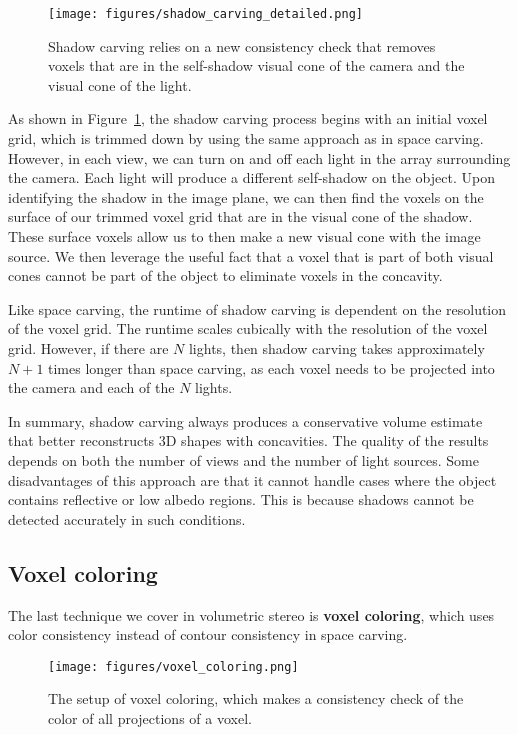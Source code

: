\documentclass[a4paper, 12pt]{article}
\renewcommand\emph{\textbf}
\numberwithin{equation}{section}
\begin{document}
\begin{figure}[h!]
    \centering
    \texttt{[image: figures/shadow\_carving\_detailed.png]}
    \caption{Shadow carving relies on a new consistency check that removes voxels that are in the self-shadow visual cone of the camera and the visual cone of the light.}
    \label{fig:shadow_carving_detailed}
\end{figure}

As shown in Figure~\ref{fig:shadow_carving_detailed}, the shadow carving process begins with an initial voxel grid, which is trimmed down by using the same approach as in space carving. However, in each view, we can turn on and off each light in the array surrounding the camera. Each light will produce a different self-shadow on the object. Upon identifying the shadow in the image plane, we can then find the voxels on the surface of our trimmed voxel grid that are in the visual cone of the shadow. These surface voxels allow us to then make a new visual cone with the image source. We then leverage the useful fact that a voxel that is part of both visual cones cannot be part of the object to eliminate voxels in the concavity. 

Like space carving, the runtime of shadow carving is dependent on the resolution of the voxel grid. The runtime scales cubically with the resolution of the voxel grid. However, if there are $N$ lights, then shadow carving takes approximately $N+1$ times longer than space carving, as each voxel needs to be projected into the camera and each of the $N$ lights.

In summary, shadow carving always produces a conservative volume estimate that better reconstructs 3D shapes with concavities. The quality of the results depends on both the number of views and the number of light sources. Some disadvantages of this approach are that it cannot handle cases where the object contains reflective or low albedo regions. This is because shadows cannot be detected accurately in such conditions.

\subsection{Voxel coloring}
The last technique we cover in volumetric stereo is \emph{voxel coloring}, which uses color consistency instead of contour consistency in space carving.

\begin{figure}[h!]
    \centering
    \texttt{[image: figures/voxel\_coloring.png]}
    \caption{The setup of voxel coloring, which makes a consistency check of the color of all projections of a voxel.}
    \label{fig:voxel_coloring}
\end{figure}
\end{document}
